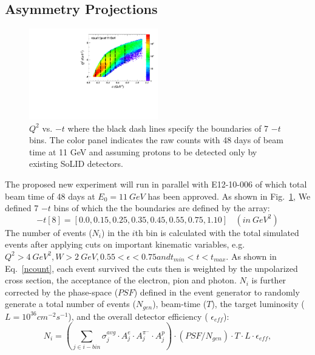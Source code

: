 \subsection{Asymmetry Projections}
\begin{figure}[!ht]
 \begin{center}
      \includegraphics[type=pdf, ext=.pdf,read=.pdf,width=0.5\textwidth]{./figures/E11_Q2_t_bin}
   \caption[$Q^{2}$ vs. $-t$]{\footnotesize{$Q^{2}$ vs. $-t$ where the black dash lines specify the boundaries of 7 $-t$ bins. The color panel indicates the raw counts with 48 days of beam time at 11 GeV and assuming protons to be detected only by existing SoLID detectors. }}
  \label{Q2_t_bin}
  \end{center}
\end{figure}
The proposed new experiment will run in parallel with E12-10-006 of which total beam time of 48 days at $E_{0}=11~GeV$ has been approved.  As shown in Fig.~\ref{Q2_t_bin}, We defined 7 $-t$ bins of which the the boundaries are defined by the array:
 \begin{equation}
     -t[8] = [0.0, 0.15, 0.25, 0.35, 0.45, 0.55, 0.75, 1.10]~~~~(in~GeV^{2})
 \end{equation}
The number of events ($N_{i}$) in the $i$th bin is calculated with the total simulated events after applying cuts on important kinematic variables, e.g. $Q^{2}>4~GeV^{2}, W>2~GeV, 0.55<\epsilon<0.75 and t_{min}<t<t_{max}$. As shown in Eq.~\ref{ncount}, each event survived the cuts then is weighted by the unpolarized cross section, the acceptance of the electron, pion and photon. $N_{i}$ is further corrected by the phase-space ($PSF$) defined in the event generator to randomly generate a total number of events ($N_{gen}$), beam-time ($T$), the target luminosity ($L=10^{36} cm^{-2}s^{-1}$), and the overall detector efficiency ( $\epsilon_{eff}$):
 \begin{equation}
     N_{i} = (\sum_{j\in i-bin} \sigma^{avg}_{j}\cdot A^{e}_{j} \cdot A^{\pi^{-}}_{j} \cdot A^{p}_{j}) \cdot (PSF/N_{gen}) \cdot T \cdot L \cdot \epsilon_{eff},
     \label{ncount}
 \end{equation}

